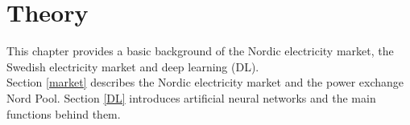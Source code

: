\chapter{Theory}
\label{cha:theory}
This chapter provides a basic background of the Nordic electricity market, the Swedish electricity market and deep learning (DL). \\
Section \ref{market} describes the Nordic electricity market and the power exchange Nord Pool. Section \ref{DL} introduces artificial neural networks and the main functions behind them. 


